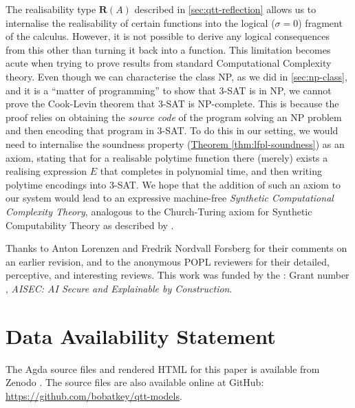 \documentclass[acmsmall,screen]{acmart}
\newcommand{\thmref}[1]{\hyperref[#1]{Theorem \ref*{#1}}}
\begin{document}
The realisability type $\mathbf{R}(A)$ described in
\autoref{sec:qtt-reflection} allows us to internalise the
realisability of certain functions into the logical ($\sigma = 0$)
fragment of the calculus. However, it is not possible to derive any
logical consequences from this other than turning it back into a
function. This limitation becomes acute when trying to prove results
from standard Computational Complexity theory. Even though we can
characterise the class NP, as we did in \autoref{sec:np-class}, and it
is a ``matter of programming'' to show that 3-SAT is in NP, we cannot
prove the Cook-Levin theorem that 3-SAT is NP-complete. This is
because the proof relies on obtaining the \emph{source code} of the
program solving an NP problem and then encoding that program in
3-SAT. To do this in our setting, we would need to internalise the
soundness property (\thmref{thm:lfpl-soundness}) as an axiom, stating
that for a realisable polytime function there (merely) exists a
realising expression $E$ that completes in polynomial time, and then
writing polytime encodings into 3-SAT. We hope that the addition of
such an axiom to our system would lead to an expressive machine-free
\emph{Synthetic Computational Complexity Theory}, analogous to the
Church-Turing axiom for Synthetic Computability Theory as described by
\citet{Bauer06}.

\begin{acks}
  Thanks to Anton Lorenzen and Fredrik Nordvall Forsberg for their
  comments on an earlier revision, and to the anonymous POPL reviewers
  for their detailed, perceptive, and interesting reviews. This work
  was funded by the : Grant number
  , \emph{AISEC: AI Secure and
    Explainable by Construction}.
\end{acks}

\section*{Data Availability Statement}

The Agda source files and rendered HTML for this paper is available
from Zenodo \cite{atkey2023polydep-artefact}. The source files are
also available online at GitHub:
\url{https://github.com/bobatkey/qtt-models}.





\end{document}

